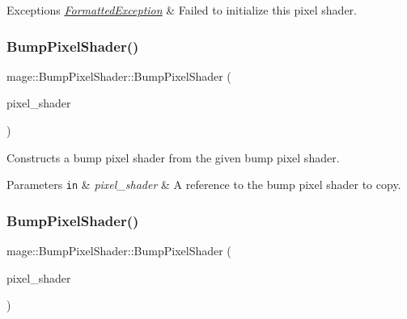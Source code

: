 \begin{DoxyExceptions}{Exceptions}
{\em \hyperlink{structmage_1_1_formatted_exception}{Formatted\+Exception}} & Failed to initialize this pixel shader. \\
\hline
\end{DoxyExceptions}
\hypertarget{classmage_1_1_bump_pixel_shader_ae2442bfecc38813e11c0fb81b1b56205}{}\label{classmage_1_1_bump_pixel_shader_ae2442bfecc38813e11c0fb81b1b56205} 
\subsubsection{\texorpdfstring{Bump\+Pixel\+Shader()}{BumpPixelShader()}\hspace{0.1cm}{\footnotesize\ttfamily [3/4]}}
{\footnotesize\ttfamily mage\+::\+Bump\+Pixel\+Shader\+::\+Bump\+Pixel\+Shader (\begin{DoxyParamCaption}\item[{const \hyperlink{classmage_1_1_bump_pixel_shader}{Bump\+Pixel\+Shader} \&}]{pixel\+\_\+shader }\end{DoxyParamCaption})\hspace{0.3cm}{\ttfamily [delete]}}

Constructs a bump pixel shader from the given bump pixel shader.


\begin{DoxyParams}[1]{Parameters}
\mbox{\tt in}  & {\em pixel\+\_\+shader} & A reference to the bump pixel shader to copy. \\
\hline
\end{DoxyParams}
\hypertarget{classmage_1_1_bump_pixel_shader_a01db1b284501b163419bf50ed9997b81}{}\label{classmage_1_1_bump_pixel_shader_a01db1b284501b163419bf50ed9997b81} 
\subsubsection{\texorpdfstring{Bump\+Pixel\+Shader()}{BumpPixelShader()}\hspace{0.1cm}{\footnotesize\ttfamily [4/4]}}
{\footnotesize\ttfamily mage\+::\+Bump\+Pixel\+Shader\+::\+Bump\+Pixel\+Shader (\begin{DoxyParamCaption}\item[{\hyperlink{classmage_1_1_bump_pixel_shader}{Bump\+Pixel\+Shader} \&\&}]{pixel\+\_\+shader }\end{DoxyParamCaption})\hspace{0.3cm}{\ttfamily [default]}}

